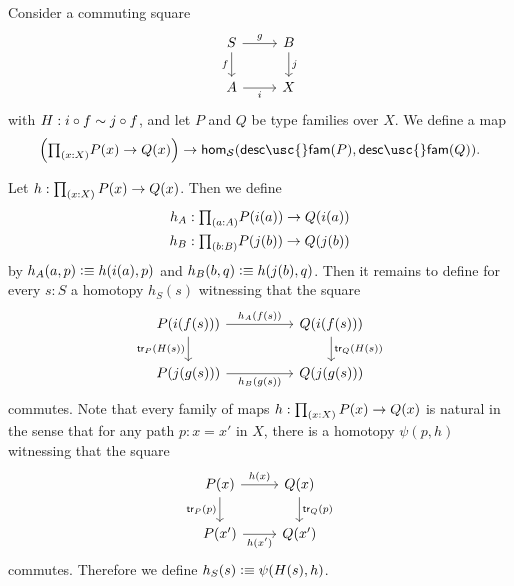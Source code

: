 \begin{defn}\label{defn:hom-Fam-pushout-map}
  Consider a commuting square
  \begin{equation*}
    \begin{tikzcd}
      S \arrow[r,"g"] \arrow[d,swap,"f"] & B \arrow[d,"j"] \\
      A \arrow[r,swap,"i"] & X
    \end{tikzcd}
  \end{equation*}
  with $H:i\circ f \sim j \circ f$, and let $P$ and $Q$ be type families over $X$. We define a map
  \begin{equation*}
    \Big(\prd{x:X}P(x)\to Q(x)\Big) \to \mathsf{hom}_{\mathcal{S}}(\mathsf{desc\usc{}fam}(P),\mathsf{desc\usc{}fam}(Q)).
  \end{equation*}
\end{defn}

\begin{constr}
  Let $h:\prd{x:X}P(x)\to Q(x)$. Then we define
  \begin{align*}
    h_A & : \prd{a:A}P(i(a))\to Q(i(a)) \\
    h_B & : \prd{b:B}P(j(b))\to Q(j(b))
  \end{align*}
  by $h_A(a,p)\vcentcolon\equiv h(i(a),p)$ and $h_B(b,q)\vcentcolon\equiv h(j(b),q)$. Then it remains to define for every $s:S$ a homotopy $h_S(s)$ witnessing that the square
  \begin{equation*}
    \begin{tikzcd}[column sep=huge]
      P(i(f(s))) \arrow[r,"h_A(f(s))"] \arrow[d,swap,"\mathsf{tr}_P(H(s))"] & Q(i(f(s))) \arrow[d,"\mathsf{tr}_Q(H(s))"] \\
      P(j(g(s))) \arrow[r,swap,"h_B(g(s))"] & Q(j(g(s)))
    \end{tikzcd}
  \end{equation*}
  commutes. Note that every family of maps $h:\prd{x:X}P(x)\to Q(x)$ is natural in the sense that for any path $p:x=x'$ in $X$, there is a homotopy $\psi(p,h)$ witnessing that the square
  \begin{equation*}
    \begin{tikzcd}
      P(x) \arrow[r,"h(x)"] \arrow[d,swap,"\mathsf{tr}_P(p)"] & Q(x) \arrow[d,"\mathsf{tr}_Q(p)"] \\
      P(x') \arrow[r,swap,"{h(x')}"] & Q(x')
    \end{tikzcd}
  \end{equation*}
  commutes. Therefore we define $h_S(s)\vcentcolon\equiv\psi(H(s),h)$.
\end{constr}

